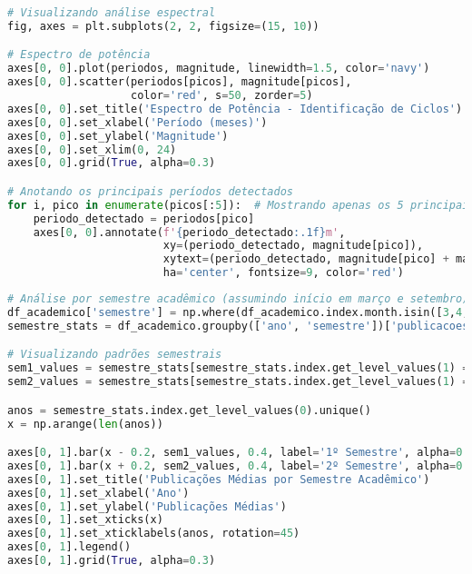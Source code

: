 \begin{pythonbox}
\begin{lstlisting}[language=Python]
# Visualizando análise espectral
fig, axes = plt.subplots(2, 2, figsize=(15, 10))

# Espectro de potência
axes[0, 0].plot(periodos, magnitude, linewidth=1.5, color='navy')
axes[0, 0].scatter(periodos[picos], magnitude[picos], 
                   color='red', s=50, zorder=5)
axes[0, 0].set_title('Espectro de Potência - Identificação de Ciclos')
axes[0, 0].set_xlabel('Período (meses)')
axes[0, 0].set_ylabel('Magnitude')
axes[0, 0].set_xlim(0, 24)
axes[0, 0].grid(True, alpha=0.3)

# Anotando os principais períodos detectados
for i, pico in enumerate(picos[:5]):  # Mostrando apenas os 5 principais
    periodo_detectado = periodos[pico]
    axes[0, 0].annotate(f'{periodo_detectado:.1f}m', 
                        xy=(periodo_detectado, magnitude[pico]),
                        xytext=(periodo_detectado, magnitude[pico] + magnitude[pico]*0.1),
                        ha='center', fontsize=9, color='red')
\end{lstlisting}
\end{pythonbox}

\begin{pythonbox}
\begin{lstlisting}[language=Python]
# Análise por semestre acadêmico (assumindo início em março e setembro)
df_academico['semestre'] = np.where(df_academico.index.month.isin([3,4,5,6,7,8]), 1, 2)
semestre_stats = df_academico.groupby(['ano', 'semestre'])['publicacoes'].agg(['mean', 'sum', 'std'])

# Visualizando padrões semestrais
sem1_values = semestre_stats[semestre_stats.index.get_level_values(1) == 1]['mean'].values
sem2_values = semestre_stats[semestre_stats.index.get_level_values(1) == 2]['mean'].values

anos = semestre_stats.index.get_level_values(0).unique()
x = np.arange(len(anos))

axes[0, 1].bar(x - 0.2, sem1_values, 0.4, label='1º Semestre', alpha=0.7, color='lightblue')
axes[0, 1].bar(x + 0.2, sem2_values, 0.4, label='2º Semestre', alpha=0.7, color='orange')
axes[0, 1].set_title('Publicações Médias por Semestre Acadêmico')
axes[0, 1].set_xlabel('Ano')
axes[0, 1].set_ylabel('Publicações Médias')
axes[0, 1].set_xticks(x)
axes[0, 1].set_xticklabels(anos, rotation=45)
axes[0, 1].legend()
axes[0, 1].grid(True, alpha=0.3)
\end{lstlisting}
\end{pythonbox}

